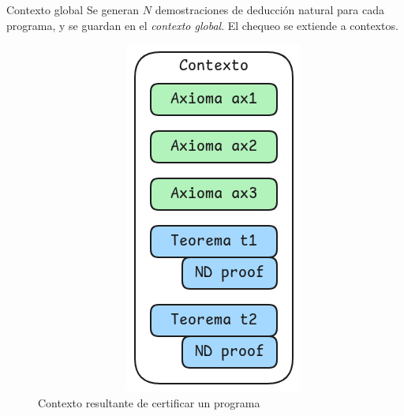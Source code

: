 \documentclass[xcolor={dvipsnames},spanish]{beamer}
\begin{document}
\begin{frame}{Contexto global}
    Se generan $N$ demostraciones de deducción natural para cada programa, y se guardan en el \textit{contexto global}. El chequeo se extiende a contextos.
    
    \begin{figure}
        \begin{columns}
            \begin{column}{0.4\textwidth}
                \begin{tabular}{c}
                    
                \end{tabular}
            \end{column}
            \begin{column}{0.3\textwidth}
                \includegraphics[scale=0.4]{img/ppa-context.png}
            \end{column}
        \end{columns}
        \caption{Contexto resultante de certificar un programa}
    \end{figure}
\end{frame}
\end{document}

